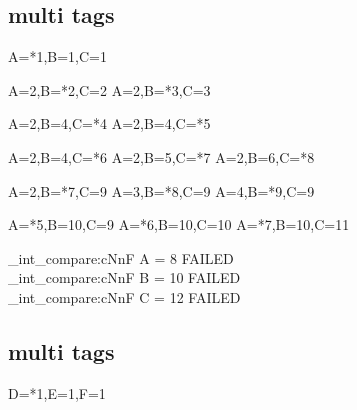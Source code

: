 \subsection{ multi tags}

\bgroup


\begin{CDRBlock} [
  tags={A,B,C},
  numbers=left,
  firstnumber=last,
]
A=*1,B=1,C=1
\end{CDRBlock}

\begin{CDRBlock} [
  tags={B,C},
  numbers=left,
  firstnumber=last,
]
A=2,B=*2,C=2
A=2,B=*3,C=3
\end{CDRBlock}

\begin{CDRBlock} [
  tags=C,
  numbers=left,
  firstnumber=last,
]
A=2,B=4,C=*4
A=2,B=4,C=*5
\end{CDRBlock}

\begin{CDRBlock} [
  tags={C, B},
  numbers=left,
  firstnumber=last,
]
A=2,B=4,C=*6
A=2,B=5,C=*7
A=2,B=6,C=*8
\end{CDRBlock}

\begin{CDRBlock} [
  tags={B, A},
  numbers=left,
  firstnumber=last,
]
A=2,B=*7,C=9
A=3,B=*8,C=9
A=4,B=*9,C=9
\end{CDRBlock}
\begin{CDRBlock} [
  tags={A,C},
  numbers=left,
  firstnumber=last,
]
A=*5,B=10,C=9
A=*6,B=10,C=10
A=*7,B=10,C=11
\end{CDRBlock}

\ExplSyntaxOn
\CDR_int_compare:cNnF { A } = 8 { FAILED \\ }
\CDR_int_compare:cNnF { B } = {10} { FAILED \\ }
\CDR_int_compare:cNnF { C } = {12} { FAILED \\ }
\ExplSyntaxOff

\egroup

\subsection{ multi tags}

\bgroup

\begin{CDRBlock} [
  tags={D,E,F},
]
D=*1,E=1,F=1
\end{CDRBlock}

